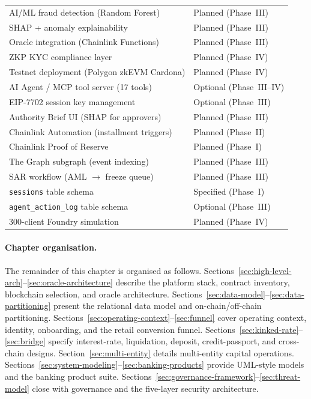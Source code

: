 \documentclass[12pt, a4paper]{report}
\newcommand{\tmarkPartial}{\faHourglassHalf}
\newcommand{\tmarkPlanned}{\textcolor{black!55}{\faCircle}}
\begin{document}
\begin{table}[H]
\begin{tabular}{@{}p{7.1cm}>{\raggedleft\arraybackslash}p{5.9cm}@{}}
AI/ML fraud detection (Random Forest) & \tmarkPlanned{} Planned (Phase~III) \\
SHAP + anomaly explainability & \tmarkPlanned{} Planned (Phase~III) \\
\rowcolor{RowShade}
Oracle integration (Chainlink Functions) & \tmarkPlanned{} Planned (Phase~III) \\
ZKP KYC compliance layer & \tmarkPlanned{} Planned (Phase~IV) \\
\rowcolor{RowShade}
Testnet deployment (Polygon zkEVM Cardona) & \tmarkPlanned{} Planned (Phase~IV) \\
AI Agent / MCP tool server (17 tools) & \tmarkPlanned{} Optional (Phase~III--IV) \\
\rowcolor{RowShade}
EIP-7702 session key management & \tmarkPlanned{} Optional (Phase~III) \\
Authority Brief UI (SHAP for approvers) & \tmarkPlanned{} Planned (Phase~III) \\
\rowcolor{RowShade}
Chainlink Automation (installment triggers) & \tmarkPlanned{} Planned (Phase~II) \\
Chainlink Proof of Reserve & \tmarkPlanned{} Planned (Phase~I) \\
\rowcolor{RowShade}
The Graph subgraph (event indexing) & \tmarkPlanned{} Planned (Phase~III) \\
SAR workflow (AML $\to$ freeze queue) & \tmarkPlanned{} Planned (Phase~III) \\
\rowcolor{RowShade}
\texttt{sessions} table schema & \tmarkPartial{} Specified (Phase~I) \\
\texttt{agent\_action\_log} table schema & \tmarkPlanned{} Optional (Phase~III) \\
\rowcolor{RowShade}
300-client Foundry simulation & \tmarkPlanned{} Planned (Phase~IV) \\
\bottomrule
\end{tabular}
\end{table}

\paragraph{Chapter organisation.}
The remainder of this chapter is organised as follows. Sections~\ref{sec:high-level-arch}--\ref{sec:oracle-architecture} describe the platform stack, contract inventory, blockchain selection, and oracle architecture. Sections~\ref{sec:data-model}--\ref{sec:data-partitioning} present the relational data model and on-chain/off-chain partitioning. Sections~\ref{sec:operating-context}--\ref{sec:funnel} cover operating context, identity, onboarding, and the retail conversion funnel. Sections~\ref{sec:kinked-rate}--\ref{sec:bridge} specify interest-rate, liquidation, deposit, credit-passport, and cross-chain designs. Section~\ref{sec:multi-entity} details multi-entity capital operations. Sections~\ref{sec:system-modeling}--\ref{sec:banking-products} provide UML-style models and the banking product suite. Sections~\ref{sec:governance-framework}--\ref{sec:threat-model} close with governance and the five-layer security architecture.
\end{document}

